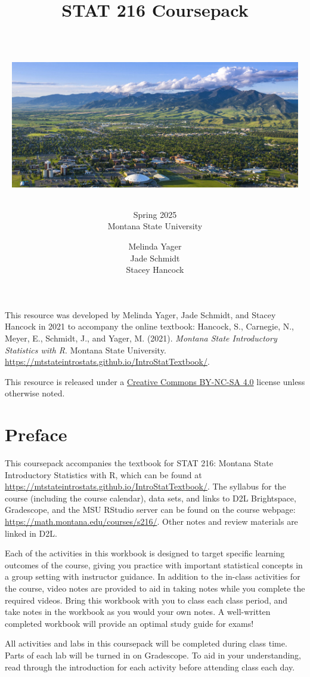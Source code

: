 \documentclass[
]{report}
\title{\textbf{STAT 216 Coursepack}\\
\strut \\
\includegraphics[width=5in,height=\textheight]{images/msu-campus.jpg}}
\subtitle{Spring 2025\\
Montana State University}
\author{Melinda Yager\\
Jade Schmidt\\
Stacey Hancock}
\date{}
\begin{document}
\maketitle

\newpage
\thispagestyle{empty}

This resource was developed by Melinda Yager, Jade Schmidt, and Stacey Hancock in 2021 to accompany the online textbook: Hancock, S., Carnegie, N., Meyer, E., Schmidt, J., and Yager, M. (2021). \emph{Montana State Introductory Statistics with R}. Montana State University. \url{https://mtstateintrostats.github.io/IntroStatTextbook/}.

This resource is released under a \href{https://creativecommons.org/licenses/by-nc-sa/4.0/}{Creative Commons BY-NC-SA 4.0} license unless otherwise noted.

\setcounter{tocdepth}{1}
\tableofcontents
\thispagestyle{empty}

\newpage
\setcounter{page}{1}

\chapter*{Preface}\label{preface}

This coursepack accompanies the textbook for STAT 216: Montana State Introductory Statistics with R, which can be found at \url{https://mtstateintrostats.github.io/IntroStatTextbook/}. The syllabus for the course (including the course calendar), data sets, and links to D2L Brightspace, Gradescope, and the MSU RStudio server can be found on the course webpage: \url{https://math.montana.edu/courses/s216/}.
Other notes and review materials are linked in D2L.

Each of the activities in this workbook is designed to target specific learning outcomes of the course, giving you practice with important statistical concepts in a group setting with instructor guidance. In addition to the in-class activities for the course, video notes are provided to aid in taking notes while you complete the required videos. Bring this workbook with you to class each class period, and take notes in the workbook as you would your own notes. A well-written completed workbook will provide an optimal study guide for exams!

All activities and labs in this coursepack will be completed during class time. Parts of each lab will be turned in on Gradescope. To aid in your understanding, read through the introduction for each activity before attending class each day.
\end{document}
